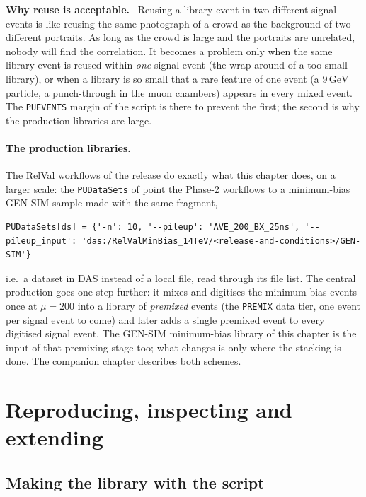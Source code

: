 \documentclass[11pt,a4paper]{article}
\newcommand{\code}[1]{\texttt{#1}}
\newcommand{\GeV}{\,\mathrm{GeV}}
\newenvironment{plainwords}[1][In plain words]{%
  \par\medskip\noindent\setlength{\fboxsep}{6pt}\setlength{\fboxrule}{0.6pt}%
  \begin{lrbox}{\plainbox}\begin{minipage}{\dimexpr\textwidth-2\fboxsep-2\fboxrule\relax}\small
  \textbf{\textcolor{plainrule}{#1.}}\ \ignorespaces}{%
  \end{minipage}\end{lrbox}\noindent\fcolorbox{plainrule}{plainbg}{\usebox{\plainbox}}\par\medskip}
\begin{document}
\begin{plainwords}[Why reuse is acceptable]
Reusing a library event in two different signal events is like reusing the same photograph of a crowd as the
background of two different portraits. As long as the crowd is large and the portraits are unrelated,
nobody will find the correlation. It becomes a problem only when the same library event is reused within
\emph{one} signal event (the wrap-around of a too-small library), or when a library is so small that a
rare feature of one event (a $9\GeV$ particle, a punch-through in the muon chambers) appears in every mixed
event. The \code{PUEVENTS} margin of the script is there to prevent the first; the second is why the
production libraries are large.
\end{plainwords}

\paragraph{The production libraries.} The RelVal workflows of the release do exactly what this chapter
does, on a larger scale: the \code{PUDataSets} of
 point the Phase-2 workflows to a minimum-bias
GEN-SIM sample made with the same fragment,
\begin{lstlisting}[style=py]
PUDataSets[ds] = {'-n': 10, '--pileup': 'AVE_200_BX_25ns', '--pileup_input': 'das:/RelValMinBias_14TeV/<release-and-conditions>/GEN-SIM'}
\end{lstlisting}
i.e.\ a dataset in DAS instead of a local file, read through its file list. The central production goes one
step further: it mixes and digitises the minimum-bias events once at $\mu=200$ into a library of
\emph{premixed} events (the \code{PREMIX} data tier, one event per signal event to come) and later adds a
single premixed event to every digitised signal event. The GEN-SIM minimum-bias library of this chapter is
the input of that premixing stage too; what changes is only where the stacking is done. The companion
chapter describes both schemes.

\section{Reproducing, inspecting and extending}
\label{sec:extend}

\subsection{Making the library with the script}
\end{document}
